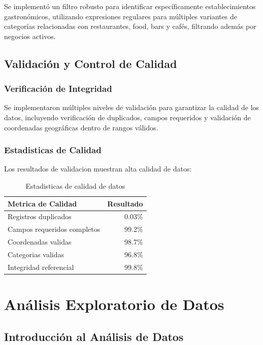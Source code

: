 \documentclass[12pt,a4paper,twoside,openany]{book}
\begin{document}
Se implementó un filtro robusto para identificar específicamente establecimientos gastronómicos, utilizando expresiones regulares para múltiples variantes de categorías relacionadas con restaurantes, food, bars y cafés, filtrando además por negocios activos.

\section{Validación y Control de Calidad}

\subsection{Verificación de Integridad}

Se implementaron múltiples niveles de validación para garantizar la calidad de los datos, incluyendo verificación de duplicados, campos requeridos y validación de coordenadas geográficas dentro de rangos válidos.

\subsection{Estadisticas de Calidad}

Los resultados de validacion muestran alta calidad de datos:

\begin{table}[H]
\centering
\caption{Estadisticas de calidad de datos}
\begin{tabular}{@{}lr@{}}
\toprule
\textbf{Metrica de Calidad} & \textbf{Resultado} \\
\midrule
Registros duplicados & 0.03\% \\
Campos requeridos completos & 99.2\% \\
Coordenadas validas & 98.7\% \\
Categorias validas & 96.8\% \\
Integridad referencial & 99.8\% \\
\bottomrule
\end{tabular}
\end{table}

\chapter{Análisis Exploratorio de Datos}

\section{Introducción al Análisis de Datos}
\end{document}
